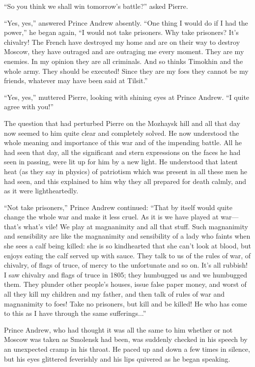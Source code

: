 ``So you think we shall win tomorrow's battle?'' asked Pierre.

``Yes, yes,'' answered Prince Andrew absently. ``One thing I
would do if I had the power,'' he began again, ``I would not take
prisoners. Why take prisoners? It's chivalry! The French have
destroyed my home and are on their way to destroy Moscow, they
have outraged and are outraging me every moment. They are my
enemies. In my opinion they are all criminals.  And so thinks
Timokhin and the whole army. They should be executed!  Since they
are my foes they cannot be my friends, whatever may have been
said at Tilsit.''

``Yes, yes,'' muttered Pierre, looking with shining eyes at
Prince Andrew.  ``I quite agree with you!''

The question that had perturbed Pierre on the Mozhaysk hill and
all that day now seemed to him quite clear and completely
solved. He now understood the whole meaning and importance of
this war and of the impending battle. All he had seen that day,
all the significant and stern expressions on the faces he had
seen in passing, were lit up for him by a new light. He
understood that latent heat (as they say in physics) of
patriotism which was present in all these men he had seen, and
this explained to him why they all prepared for death calmly, and
as it were lightheartedly.

``Not take prisoners,'' Prince Andrew continued: ``That by itself
would quite change the whole war and make it less cruel. As it is
we have played at war---that's what's vile! We play at
magnanimity and all that stuff. Such magnanimity and sensibility
are like the magnanimity and sensibility of a lady who faints
when she sees a calf being killed: she is so kindhearted that she
can't look at blood, but enjoys eating the calf served up with
sauce. They talk to us of the rules of war, of chivalry, of flags
of truce, of mercy to the unfortunate and so on. It's all
rubbish! I saw chivalry and flags of truce in 1805; they
humbugged us and we humbugged them. They plunder other people's
houses, issue false paper money, and worst of all they kill my
children and my father, and then talk of rules of war and
magnanimity to foes! Take no prisoners, but kill and be killed!
He who has come to this as I have through the same
sufferings...''

Prince Andrew, who had thought it was all the same to him whether
or not Moscow was taken as Smolensk had been, was suddenly
checked in his speech by an unexpected cramp in his throat. He
paced up and down a few times in silence, but his eyes glittered
feverishly and his lips quivered as he began speaking.

